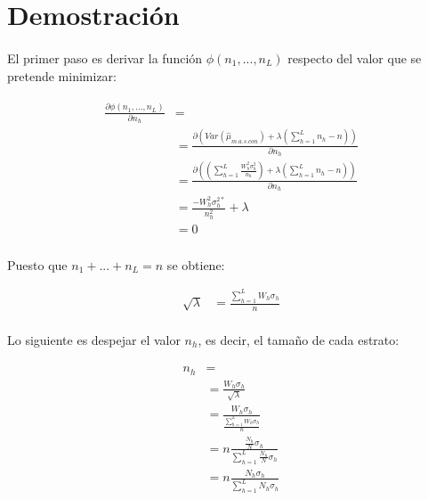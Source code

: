 \documentclass{article}
\begin{document}
  \section{Demostración}

    \paragraph{}
    El primer paso es derivar la función $\phi(n_1, ..., n_L)$ respecto del valor que se pretende minimizar:

    \begin{align}
    \label{eq:derivate_1}
      \begin{split}
        \frac{\partial \phi(n_1, ..., n_L)}{\partial n_h} &= \\
        &= \frac{\partial\left( Var(\widehat{\mu}_{m.a.s.con})
        + \lambda \left( \sum\limits_{h=1}^L n_h - n\right)\right) }{\partial n_h} \\
        &= \frac{\partial\left( \left(\sum\limits_{h=1}^L\frac{W_h^2\sigma_h^{2}}{n_h}\right)
        + \lambda \left( \sum\limits_{h=1}^L n_h - n\right)\right) }{\partial n_h} \\
        &= \frac{-W_h^2 \sigma_h^{2*}}{n_h^2} +\lambda \\
        &= 0
      \end{split}
    \end{align}

    \paragraph{}
    Puesto que $n_1 + ... + n_L = n$ se obtiene:

    \begin{align}
      \sqrt{\lambda} &= \frac{\sum\limits_{h=1}^L W_h \sigma_h}{n}
    \end{align}

    \paragraph{}
    Lo siguiente es despejar el valor $n_h$, es decir, el tamaño de cada estrato:

    \begin{align}
      \begin{split}
        n_h &= \\
        &= \frac{W_h \sigma_h}{\sqrt{\lambda}}\\
        &= \frac{W_h \sigma_h}{\frac{\sum\limits_{h=1}^L W_h \sigma_h }{n}}\\
        &= n\frac{\frac{N_h}{N} \sigma_h}{\sum\limits_{h=1}^L \frac{N_h}{N} \sigma_h }\\
        &= n\frac{N_h \sigma_h}{\sum\limits_{h=1}^L N_h \sigma_h }
      \end{split}
    \end{align}
\end{document}
